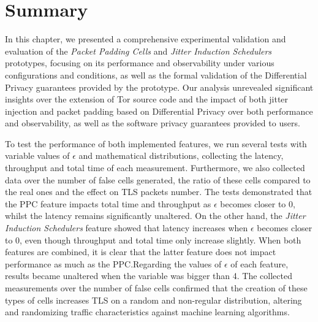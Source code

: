 \section{Summary}\label{sec:validation_summary} %

In this chapter, we presented a comprehensive experimental validation and evaluation of the \textit{Packet Padding Cells} and \textit{Jitter Induction Schedulers} prototypes, focusing on its performance and observability under various configurations and conditions, as well as the formal validation of the Differential Privacy guarantees provided by the prototype. Our analysis unrevealed significant insights over the extension of Tor source code and the impact of both jitter injection and packet padding based on Differential Privacy over both performance and observability, as well as the software privacy guarantees provided to users. 

To test the performance of both implemented features, we run several tests with variable values of $\epsilon$ and mathematical distributions, collecting the latency, throughput and total time of each measurement. Furthermore, we also collected data over the number of false cells generated, the ratio of these cells compared to the real ones and the effect on TLS packets number.
The tests demonstrated that the PPC feature impacts total time and throughput as $\epsilon$ becomes closer to 0, whilst the latency remains significantly unaltered. On the other hand, the \textit{Jitter Induction Schedulers} feature showed that latency increases when $\epsilon$ becomes closer to 0, even though throughput and total time only increase slightly. When both features are combined, it is clear that the latter feature does not impact performance as much as the PPC.\@ Regarding the values of $\epsilon$ of each feature, results became unaltered when the variable was bigger than 4.
The collected measurements over the number of false cells confirmed that the creation of these types of cells increases TLS on a random and non-regular distribution, altering and randomizing traffic characteristics against machine learning algorithms.

